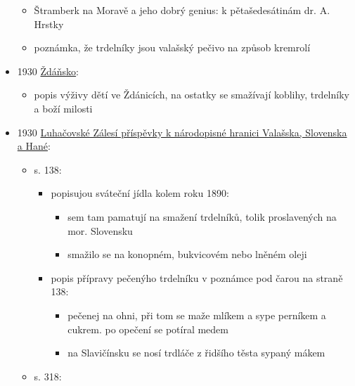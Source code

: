 \begin{itemize}
  \begin{itemize}
  \tightlist
  \item
    Štramberk na Moravě a jeho dobrý genius: k pětašedesátinám dr. A.
    Hrstky
  \item
    poznámka, že trdelníky jsou valašský pečivo na způsob kremrolí
  \end{itemize}
\item
  1930
  \href{https://ceskadigitalniknihovna.cz/view/uuid:e8387412-1c76-452f-9ecf-f705f1af03b3?page=uuid\%3Acd84eba0-525b-11e5-a788-0050569d679d&fulltext=trdeln\%C3\%ADk\%20OR\%20trdeln\%C3\%ADky\%20OR\%20trdeln\%C3\%ADk\%C5\%AF&source=mzk}{Ždáňsko}:

  \begin{itemize}
  \tightlist
  \item
    popis výživy dětí ve Ždánicích, na ostatky se smažívají koblihy,
    trdelníky a boží milosti
  \end{itemize}
\item
  1930
  \href{https://ndk.cz/view/uuid:2d9fa8a0-5063-11e4-8344-005056827e52?page=uuid:1b35e0b0-77b1-11e4-9605-005056825209&fulltext=trdeln\%C3\%ADk\%C5\%AF}{Luhačovské
  Zálesí příspěvky k národopisné hranici Valašska, Slovenska a Hané}:

  \begin{itemize}
  \tightlist
  \item
    s. 138:

    \begin{itemize}
    \tightlist
    \item
      popisujou sváteční jídla kolem roku 1890:

      \begin{itemize}
      \tightlist
      \item
        sem tam pamatují na smažení trdelníků, tolik proslavených na
        mor. Slovensku
      \item
        smažilo se na konopném, bukvicovém nebo lněném oleji
      \end{itemize}
    \item
      popis přípravy pečenýho trdelníku v poznámce pod čarou na straně
      138:

      \begin{itemize}
      \tightlist
      \item
        pečenej na ohni, při tom se maže mlíkem a sype perníkem a
        cukrem. po opečení se potíral medem
      \item
        na Slavičínsku se nosí trdláče z řidšího těsta sypaný mákem
      \end{itemize}
    \end{itemize}
  \item
    s. 318:


\end{itemize}
\end{itemize}
